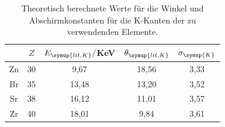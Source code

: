 \begin{table}
	\begin{center}
    \caption{Theoretisch berechnete Werte für die Winkel und Abschirmkonstanten
    für die K-Kanten der zu verwendenden Elemente.}
    \label{tab:theoriewerte}
		\begin{tabular}{ccccc}
		\toprule
			& {$Z$} & {$E_{\symup{lit, K}}/$KeV} & {$\theta_{\symup{lit, K}}$} & {$\sigma_{\symup{K}}$}\\
			\midrule
			Zn & 30  & 9,67  &  18,56   &  3,33  \\
      Br &  35  & 13,48 &  13,20  &  3,52 \\
      Sr &  38  & 16,12 &  11,01  &  3,57 \\
      Zr &  40  & 18,01 &  9,84   &  3,61 \\
		\bottomrule
		\end{tabular}
	\end{center}
\end{table}

